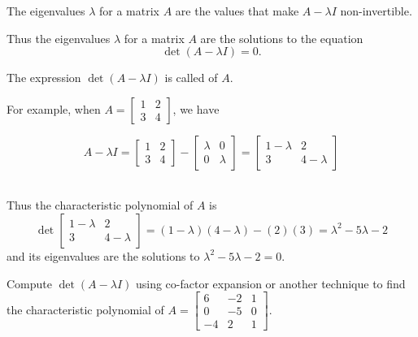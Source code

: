 \begin{fact}
  The eigenvalues \(\lambda\) for a matrix \(A\) are the values
  that make \(A-\lambda I\) non-invertible.

  \vspace{1em}

  Thus the eigenvalues \(\lambda\) for a matrix \(A\)
  are the solutions to
  the equation \[\det(A-\lambda I)=0.\]
\end{fact}

\begin{definition}
The expression \(\det(A-\lambda I)\) is called
 of \(A\). \\

\vspace{1em} 

For example, when
\(A=\begin{bmatrix}1 & 2 \\ 3 & 4\end{bmatrix}\), we have

\[
  A-\lambda I=
  \begin{bmatrix}1 & 2 \\ 3 & 4\end{bmatrix}-
  \begin{bmatrix}\lambda & 0 \\ 0 & \lambda\end{bmatrix}=
  \begin{bmatrix}1-\lambda & 2 \\ 3 & 4-\lambda\end{bmatrix}
\]

\ \\
Thus the characteristic polynomial of \(A\) is
\[
  \det\begin{bmatrix}1-\lambda & 2 \\ 3 & 4-\lambda\end{bmatrix}
=
  (1-\lambda)(4-\lambda)-(2)(3)
=
  \lambda^2-5\lambda-2
\]
and its eigenvalues are the solutions to \(\lambda^2-5\lambda-2=0\).
\end{definition}

\begin{activity}{10}
  Compute $\det(A-\lambda I)$ using co-factor expansion or another technique
  to find the characteristic polynomial of
  \(A=\begin{bmatrix} 6 & -2 & 1 \\ 0 & -5 & 0 \\ -4 & 2 & 1 \end{bmatrix}\).
\end{activity}

